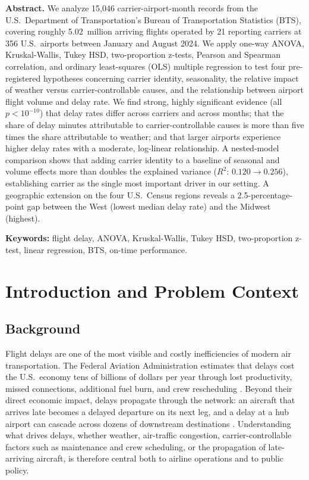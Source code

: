 \documentclass[12pt,letterpaper]{article}
\begin{document}
\noindent\textbf{Abstract.}
We analyze 15{,}046 carrier-airport-month records from the U.S.\ Department
of Transportation's Bureau of Transportation Statistics (BTS), covering
roughly 5.02~million arriving flights operated by 21 reporting carriers at
356 U.S.\ airports between January and August 2024. We apply one-way ANOVA,
Kruskal-Wallis, Tukey HSD, two-proportion z-tests, Pearson and Spearman
correlation, and ordinary least-squares (OLS) multiple regression to test
four pre-registered hypotheses concerning carrier identity, seasonality,
the relative impact of weather versus carrier-controllable causes, and the
relationship between airport flight volume and delay rate. We find strong,
highly significant evidence (all $p<10^{-10}$) that delay rates differ
across carriers and across months; that the share of delay minutes
attributable to carrier-controllable causes is more than five times the
share attributable to weather; and that larger airports experience higher
delay rates with a moderate, log-linear relationship. A nested-model
comparison shows that adding carrier identity to a baseline of seasonal
and volume effects more than doubles the explained variance ($R^2$:
$0.120 \!\rightarrow\! 0.256$), establishing carrier as the single most
important driver in our setting. A geographic extension on the four U.S.\
Census regions reveals a 2.5-percentage-point gap between the West
(lowest median delay rate) and the Midwest (highest).

\vspace{2pt}
\noindent\textbf{Keywords:} flight delay, ANOVA, Kruskal-Wallis, Tukey HSD,
two-proportion z-test, linear regression, BTS, on-time performance.

\section{Introduction and Problem Context}

\subsection{Background}
Flight delays are one of the most visible and costly inefficiencies of
modern air transportation. The Federal Aviation Administration estimates
that delays cost the U.S.\ economy tens of billions of dollars per year
through lost productivity, missed connections, additional fuel burn, and
crew rescheduling \citep{faa2024}. Beyond their direct economic impact,
delays propagate through the network: an aircraft that arrives late
becomes a delayed departure on its next leg, and a delay at a hub airport
can cascade across dozens of downstream destinations \citep{kafle2017}.
Understanding what drives delays, whether weather, air-traffic congestion,
carrier-controllable factors such as maintenance and crew scheduling, or
the propagation of late-arriving aircraft, is therefore central both
to airline operations and to public policy.
\end{document}

